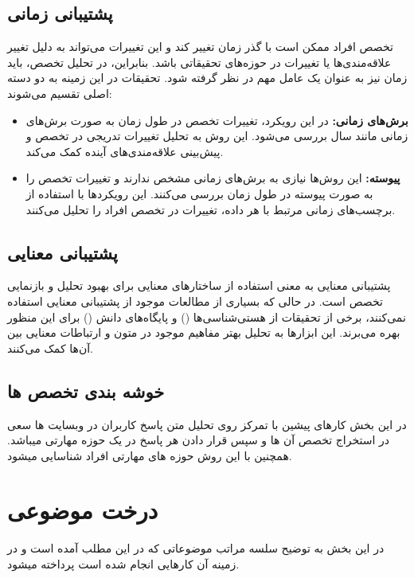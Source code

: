 \subsection*{پشتیبانی زمانی} تخصص افراد ممکن است با گذر زمان تغییر کند و این تغییرات می‌تواند به دلیل تغییر علاقه‌مندی‌ها یا تغییرات در حوزه‌های تحقیقاتی باشد. بنابراین، در تحلیل تخصص، باید زمان نیز به عنوان یک عامل مهم در نظر گرفته شود. تحقیقات در این زمینه به دو دسته اصلی تقسیم می‌شوند: \begin{itemize} \item \textbf{برش‌های زمانی:} در این رویکرد، تغییرات تخصص در طول زمان به صورت برش‌های زمانی مانند سال بررسی می‌شود. این روش به تحلیل تغییرات تدریجی در تخصص و پیش‌بینی علاقه‌مندی‌های آینده کمک می‌کند. \item \textbf{پیوسته:} این روش‌ها نیازی به برش‌های زمانی مشخص ندارند و تغییرات تخصص را به صورت پیوسته در طول زمان بررسی می‌کنند. این رویکردها با استفاده از برچسب‌های زمانی مرتبط با هر داده، تغییرات در تخصص افراد را تحلیل می‌کنند. \end{itemize}

\subsection*{پشتیبانی معنایی} پشتیبانی معنایی به معنی استفاده از ساختارهای معنایی برای بهبود تحلیل و بازنمایی تخصص است. در حالی که بسیاری از مطالعات موجود از پشتیبانی معنایی استفاده نمی‌کنند، برخی از تحقیقات از هستی‌شناسی‌ها () و پایگاه‌های دانش () برای این منظور بهره می‌برند. این ابزارها به تحلیل بهتر مفاهیم موجود در متون و ارتباطات معنایی بین آن‌ها کمک می‌کنند.

\subsection*{خوشه بندی تخصص ها}
در این بخش کارهای پیشین با تمرکز روی تحلیل متن پاسخ کاربران در وبسایت ها سعی در استخراج تخصص آن ها و سپس قرار دادن هر پاسخ در یک حوزه مهارتی میباشد.
همچنین با این روش حوزه های مهارتی افراد شناسایی میشود.

\section*{درخت موضوعی}
در این بخش به توضیح سلسه مراتب موضوعاتی که در این مطلب آمده است و در زمینه آن کارهایی انجام شده است پرداخته میشود.

